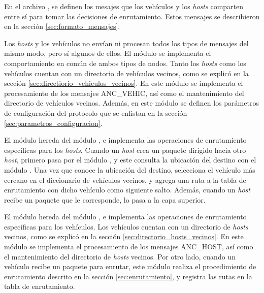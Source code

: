 
En el archivo , se definen los mesajes que los vehículos y
los \textit{hosts} comparten entre sí para tomar las decisiones de
enrutamiento. Estos mensajes se describieron en la sección
\ref{sec:formato_mensajes}.

Los \textit{hosts} y los vehículos no envían ni procesan todos los tipos de
mensajes del mismo modo, pero sí algunos de ellos. El módulo
 se implementa el comportamiento en común de ambos
tipos de nodos. Tanto los \textit{hosts} como los vehículos cuentan con un
directorio de vehículos vecinos, como se explicó en la sección
\ref{sec:directiorio_vehiculos_vecinos}. En este módulo se implementa el
procesamiento de los mensajes ANC\_VEHIC, así como el mantenimiento del
directorio de vehículos vecinos. Además, en este módulo se definen los
parámetros de configuración del protocolo que se enlistan en la sección
\ref{sec:parametros_configuracion}.

\begin{sloppypar}
El módulo  hereda del módulo
, e implementa las operaciones de enrutamiento
específicas para los \textit{hosts}. Cuando un \textit{host} crea un paquete
dirigido hacia otro \textit{host}, primero pasa por el módulo
, y este consulta la ubicación del destino con
el módulo . Una vez que conoce la ubicación del
destino, selecciona el vehículo más cercano en el diccionario de vehículos
vecinos, y agrega una ruta a la tabla de enrutamiento con dicho vehículo como
siguiente salto. Además, cuando un \textit{host} recibe un paquete que le
corresponde, lo pasa a la capa superior.
\end{sloppypar}

El módulo  hereda del módulo
, e implementa las operaciones de enrutamiento
específicas para los vehículos. Los vehículos cuentan con un directorio de
\textit{hosts} vecinos, como se explicó en la sección
\ref{sec:directorio_hosts_vecinos}. En este módulo se implementa el
procesamiento de los mensajes ANC\_HOST, así como el mantenimiento del
directorio de \textit{hosts} vecinos. Por otro lado, cuando un vehículo recibe
un paquete para enrutar, este módulo realiza el procedimiento de enrutamiento
descrito en la sección \ref{sec:enrutamiento}, y registra las rutas en la tabla
de enrutamiento.

